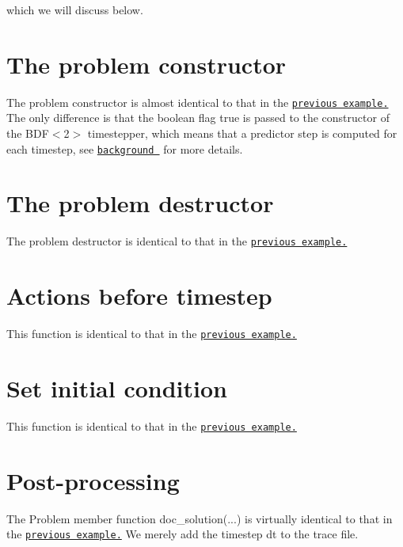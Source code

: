 which we will discuss below.



 

\hypertarget{index_constructor}{}\section{The problem constructor}\label{index_constructor}
The problem constructor is almost identical to that in the \href{../../two_d_unsteady_heat/html/index.html}{\tt previous example.} The only difference is that the boolean flag {\ttfamily true} is passed to the constructor of the {\ttfamily B\+D\+F$<$2$>$} timestepper, which means that a predictor step is computed for each timestep, see \href{#back}{\tt background } for more details.



 

\hypertarget{index_destructor}{}\section{The problem destructor}\label{index_destructor}
The problem destructor is identical to that in the \href{../../two_d_unsteady_heat/html/index.html}{\tt previous example.}



 

\hypertarget{index_before_timestep}{}\section{Actions before timestep}\label{index_before_timestep}
This function is identical to that in the \href{../../two_d_unsteady_heat/html/index.html}{\tt previous example.}



 

\hypertarget{index_IC}{}\section{Set initial condition}\label{index_IC}
This function is identical to that in the \href{../../two_d_unsteady_heat2/html/index.html}{\tt previous example.}



 

\hypertarget{index_doc}{}\section{Post-\/processing}\label{index_doc}
The Problem member function {\ttfamily doc\+\_\+solution}(...) is virtually identical to that in the \href{../../two_d_unsteady_heat2/html/index.html}{\tt previous example.} We merely add the timestep {\ttfamily dt} to the trace file.



